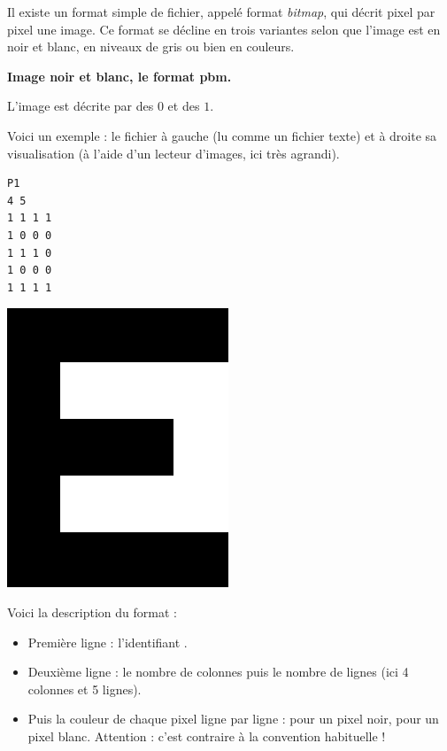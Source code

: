 \documentclass[11pt,class=report,crop=false]{standalone}
\begin{document}
\begin{cours}


Il existe un format simple de fichier, appelé format \emph{bitmap}, qui décrit pixel par pixel une image. Ce format se décline en trois variantes 
selon que l'image est en noir et blanc, en niveaux de gris ou bien en couleurs.

\medskip

\textbf{Image noir et blanc, le format \og{}pbm\fg{}.}

L'image est décrite par des $0$ et des $1$.

Voici un exemple : le fichier  à gauche (lu comme un fichier texte)  et à droite sa visualisation (à l'aide d'un lecteur d'images, ici très agrandi).
\begin{center}
\begin{minipage}{0.3\textwidth}
\begin{lstlisting}
P1
4 5
1 1 1 1
1 0 0 0
1 1 1 0
1 0 0 0
1 1 1 1
\end{lstlisting}
\end{minipage}
\begin{minipage}{0.3\textwidth}
\includegraphics[scale=\myscale,scale=0.2]{ecran-cours-image_nb}
\end{minipage}
\end{center}

Voici la description du format :
\begin{itemize}
  \item Première ligne : l'identifiant .
  \item Deuxième ligne : le nombre de colonnes puis le nombre de lignes (ici 4 colonnes et 5 lignes).
  \item Puis la couleur de chaque pixel ligne par ligne :  pour un pixel noir,  pour un pixel blanc. Attention : c'est contraire à la convention habituelle !
\end{itemize}  
  

\end{cours}
\end{document}
